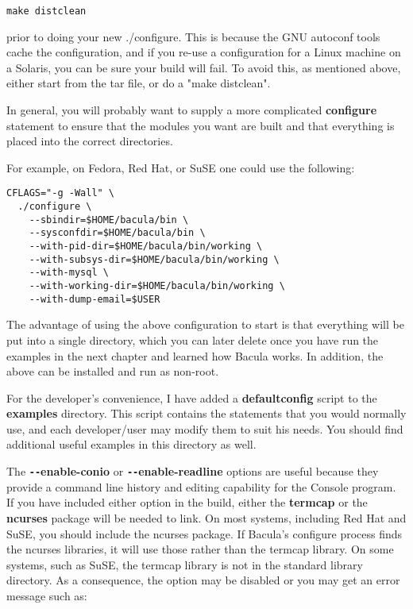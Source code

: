 \footnotesize
\begin{verbatim}
make distclean
\end{verbatim}
\normalsize

prior to doing your new ./configure. This is because the GNU autoconf tools
cache the configuration, and if you re-use a configuration for a Linux machine
on a Solaris, you can be sure your build will fail. To avoid this, as
mentioned above, either start from the tar file, or do a "make distclean". 

In general, you will probably want to supply a more complicated {\bf
configure} statement to ensure that the modules you want are built and that
everything is placed into the correct directories. 

For example, on Fedora, Red Hat, or SuSE one could use the following: 

\footnotesize
\begin{verbatim}
CFLAGS="-g -Wall" \
  ./configure \
    --sbindir=$HOME/bacula/bin \
    --sysconfdir=$HOME/bacula/bin \
    --with-pid-dir=$HOME/bacula/bin/working \
    --with-subsys-dir=$HOME/bacula/bin/working \
    --with-mysql \
    --with-working-dir=$HOME/bacula/bin/working \
    --with-dump-email=$USER
\end{verbatim}
\normalsize

The advantage of using the above configuration to start is that
everything will be put into a single directory, which you can later delete
once you have run the examples in the next chapter and learned how Bacula
works. In addition, the above can be installed and run as non-root. 

For the developer's convenience, I have added a {\bf defaultconfig} script to
the {\bf examples} directory. This script contains the statements that you
would normally use, and each developer/user may modify them to suit his needs.
You should find additional useful examples in this directory as well. 

The {\bf \verb:--:enable-conio} or {\bf \verb:--:enable-readline} options are useful because
they provide a command line history and editing capability for the Console
program. If you have included either option in the build, either the {\bf
termcap} or the {\bf ncurses} package will be needed to link. On most
systems, including Red Hat and SuSE, you should include the ncurses package.
If Bacula's configure process finds the ncurses libraries, it will use
those rather than the termcap library.
On some systems, such as SuSE, the termcap library is not in the standard
library directory.  As a consequence, the option may be disabled or you may
get an error message such as:

